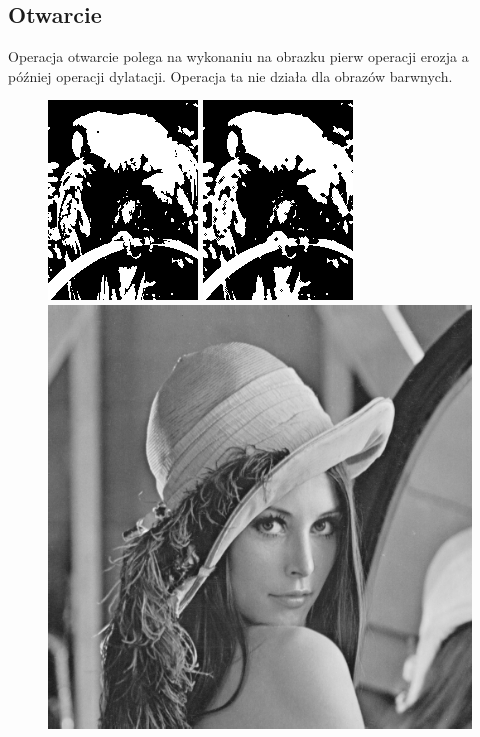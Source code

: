 \documentclass{article}
\begin{document}
\subsection{Otwarcie}
Operacja otwarcie polega na wykonaniu na obrazku pierw operacji erozja a później operacji dylatacji. Operacja ta nie działa dla obrazów barwnych.
\begin{figure}[!htb]
\centering
\includegraphics[scale=0.6]{img/papuga_1bit.png} 
\includegraphics[scale=0.6]{img/Otwarcie_Obrazu_papuga_1bit.png}\\
\includegraphics[scale=0.2]{img/lena_8bit.png}  

\end{figure}
\end{document}
